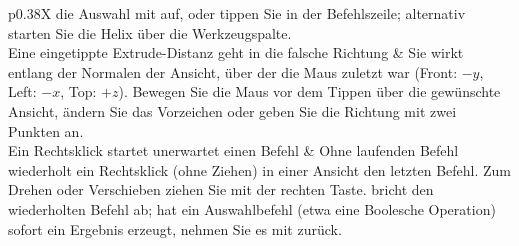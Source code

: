 \begin{referenz}{p{0.38\linewidth}X}
  die Auswahl mit  auf, oder tippen Sie in der Befehlszeile; alternativ starten Sie
  die Helix über die Werkzeugspalte. \\
Eine eingetippte Extrude-Distanz geht in die falsche Richtung &
  Sie wirkt entlang der Normalen der Ansicht, über der die Maus zuletzt war (Front: $-y$, Left:
  $-x$, Top: $+z$). Bewegen Sie die Maus vor dem Tippen über die gewünschte Ansicht, ändern Sie
  das Vorzeichen oder geben Sie die Richtung mit zwei Punkten an. \\
Ein Rechtsklick startet unerwartet einen Befehl &
  Ohne laufenden Befehl wiederholt ein Rechtsklick (ohne Ziehen) in einer Ansicht den letzten
  Befehl. Zum Drehen oder Verschieben ziehen Sie mit der rechten Taste.  bricht den
  wiederholten Befehl ab; hat ein Auswahlbefehl (etwa eine Boolesche Operation) sofort ein
  Ergebnis erzeugt, nehmen Sie es mit  zurück. \\
\bottomrule
\end{referenz}

\fussy
